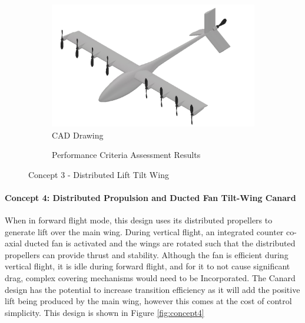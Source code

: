 \begin{figure}[H]
\centering
\begin{subfigure}[t]{.5\textwidth}
  \centering
  \includegraphics[width=0.95\linewidth]{Concepts/CAD/6cad.png}
  \vspace{0.125cm}
  \caption{CAD Drawing}
  \label{fig:cad3}
\end{subfigure}%
\begin{subfigure}[t]{.5\textwidth}
  \centering
  \caption{Performance Criteria Assessment Results}
  \label{fig:radar3}
\end{subfigure}
\caption{Concept 3 - Distributed Lift Tilt Wing}
\label{fig:concept3}
\end{figure}

\paragraph{Concept 4: Distributed Propulsion and Ducted Fan Tilt-Wing Canard}
When in forward flight mode, this design uses its distributed propellers to generate lift over the main wing. During vertical flight, an integrated counter co-axial ducted fan is activated and the wings are rotated such that the distributed propellers can provide thrust and stability. Although the fan is efficient during vertical flight, it is idle during forward flight, and for it to not cause significant drag, complex covering mechanisms would need to be Incorporated. The Canard design has the potential to increase transition efficiency as it will add the positive lift being produced by the main wing, however this comes at the cost of control simplicity. This design is shown in Figure \ref{fig:concept4}



